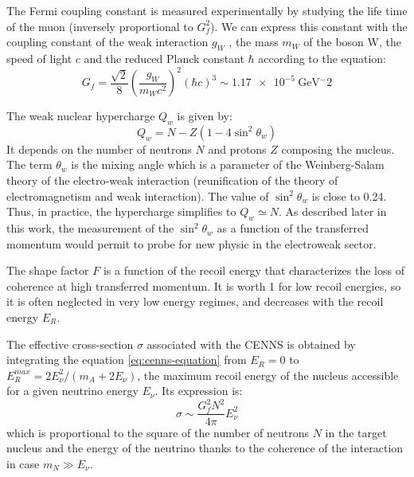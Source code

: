 The Fermi coupling constant is measured experimentally by studying  the life time of the muon (inversely proportional to $G_f^2$).
We can express this constant with the coupling constant of the weak interaction $g_W$ , the mass $m_W$ of the boson W, the speed of light $c$ and the reduced Planck constant $\hbar$ according to the equation:
\begin{equation}
G_f 
=
\frac{\sqrt{2}}{8}
\left( \frac{g_W}{m_W c^2} \right)^2
(\hbar c)^3
\sim \SI{1.17e-5}{\giga \eV^-2}
\end{equation}

The weak nuclear hypercharge $Q_w$ is given by:
\begin{equation}
Q_w = N - Z (1 - 4 \sin^2 \theta_w)
\end{equation}
It depends on the number of neutrons $N$ and protons $Z$ composing the nucleus. The term  $\theta_w$ is the mixing angle which is a parameter of the Weinberg-Salam theory of the electro-weak interaction (reunification of the theory of electromagnetism and weak interaction).
The value of $\sin^2 \theta_w$ is close to 0.24.
Thus, in practice, the hypercharge simplifies to $Q_w \simeq N$. As described later in this work, the measurement of the $\sin^2 \theta_w$ as a function of the transferred momentum would permit to probe for new physic in the electroweak sector.

The shape factor $F$ is a function of the recoil energy that characterizes the loss of coherence at high transferred momentum. It is worth 1 for low recoil energies, so it is often neglected in very low energy regimes, and decreases with the recoil energy $E_R$.

The effective cross-section $\sigma$ associated with the CENNS is obtained by integrating the equation \ref{eq:cenns-equation} from $E_R = 0$ to $E_R^{max} = 2E_{\nu}^2 / (m_A + 2E_{\nu} )$, the maximum recoil energy of the nucleus accessible for a given neutrino energy $E_{\nu}$.
Its expression is:
\begin{equation}
\sigma
\sim
\frac{G_f^2 N^2}{4\pi} E_{\nu}^2
\end{equation}
which is proportional to the square of the number of neutrons $N$ in the target nucleus and the energy of the neutrino thanks to the coherence of the interaction in case $m_N \gg E_{\nu}$.

